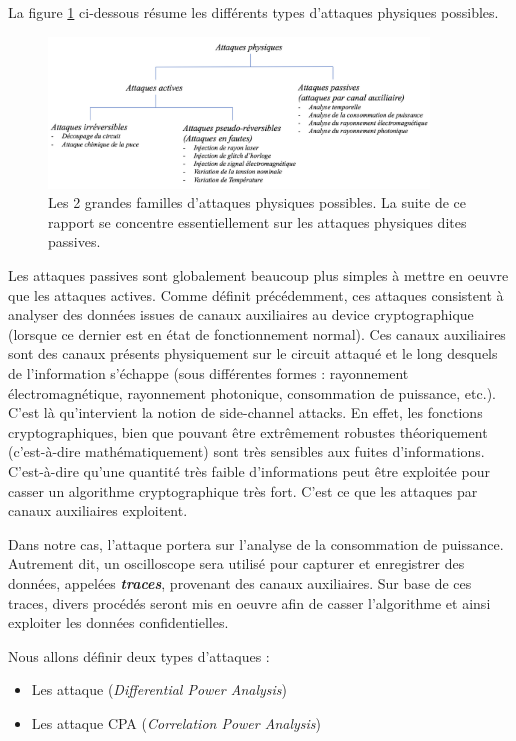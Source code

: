 \documentclass[10pt, oneside, a4paper]{article}
\begin{document}
La figure \ref{fig:attaques} ci-dessous résume les différents types d'attaques physiques possibles.
\begin{figure}[htbp]
    \centering
    \includegraphics[width=0.9\textwidth]{image/attaques}
    \caption{Les 2 grandes familles d'attaques physiques possibles. La suite de ce rapport se concentre essentiellement sur les attaques physiques dites passives.}
    \label{fig:attaques}
\end{figure}

Les attaques passives sont globalement beaucoup plus simples à mettre en oeuvre que les attaques actives. Comme définit précédemment, ces attaques consistent à analyser des données issues de canaux auxiliaires au device cryptographique (lorsque ce dernier est en état de fonctionnement normal). Ces canaux auxiliaires sont des canaux présents physiquement sur le circuit attaqué et le long desquels de l’information s’échappe (sous différentes formes : rayonnement électromagnétique, rayonnement photonique, consommation de puissance, etc.). C'est là qu'intervient la notion de side-channel attacks. 
En effet, les fonctions cryptographiques, bien que pouvant être extrêmement robustes théoriquement (c'est-à-dire mathématiquement) sont très sensibles aux fuites d’informations. C'est-à-dire qu'une quantité très faible d’informations peut être exploitée pour casser un algorithme cryptographique très fort. C’est ce que les attaques par canaux auxiliaires exploitent. 

Dans notre cas, l'attaque portera sur l'analyse de la consommation de puissance. Autrement dit, un oscilloscope sera utilisé pour capturer et enregistrer des données, appelées \textbf{\textit{traces}}, provenant des canaux auxiliaires. Sur base de ces traces, divers procédés seront mis en oeuvre afin de casser l'algorithme et ainsi exploiter les données confidentielles.

Nous allons définir deux types d'attaques : 
\begin{itemize}
\item Les attaque (\textit{Differential Power Analysis})
\item Les attaque CPA (\textit{Correlation Power Analysis}) \\
\end{itemize}
\end{document}
